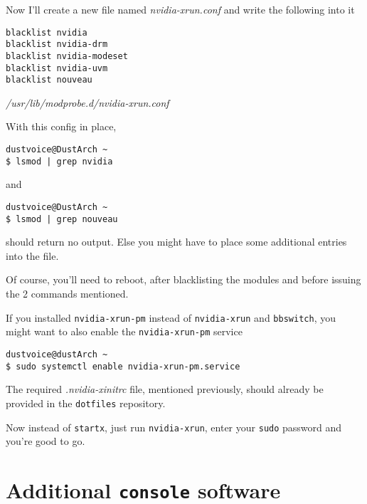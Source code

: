 \documentclass[10pt]{dustdoc}
\begin{document}
Now I’ll create a new file named \textit{nvidia-xrun.conf} and write the following into it

\begin{mintedlisting}
    \begin{verbatim}
blacklist nvidia
blacklist nvidia-drm
blacklist nvidia-modeset
blacklist nvidia-uvm
blacklist nouveau
    \end{verbatim}

    \caption{\textit{/usr/lib/modprobe.d/nvidia-xrun.conf}}
\end{mintedlisting}

With this config in place,

\begin{verbatim}
dustvoice@DustArch ~
$ lsmod | grep nvidia
\end{verbatim}

\noindent
and

\begin{verbatim}
dustvoice@DustArch ~
$ lsmod | grep nouveau
\end{verbatim}

\noindent
should return no output.
Else you might have to place some additional entries into the file.

\begin{NOTE}
    Of course, you’ll need to reboot, after blacklisting the modules and before issuing the 2 commands mentioned.
\end{NOTE}

\begin{NOTE}
    If you installed \texttt{nvidia-xrun-pm} instead of \texttt{nvidia-xrun} and \texttt{bbswitch}, you might want to also enable the \texttt{nvidia-xrun-pm} service

    \begin{verbatim}
dustvoice@dustArch ~
$ sudo systemctl enable nvidia-xrun-pm.service
    \end{verbatim}
\end{NOTE}

\begin{NOTE}
    The required \textit{.nvidia-xinitrc} file, mentioned previously, should already be provided in the \texttt{dotfiles} repository.
\end{NOTE}

Now instead of \texttt{startx}, just run \texttt{nvidia-xrun}, enter your \texttt{sudo} password and you’re good to go.

\section{Additional \texttt{console} software}
\label{sec:additional-console-software}
\end{document}
